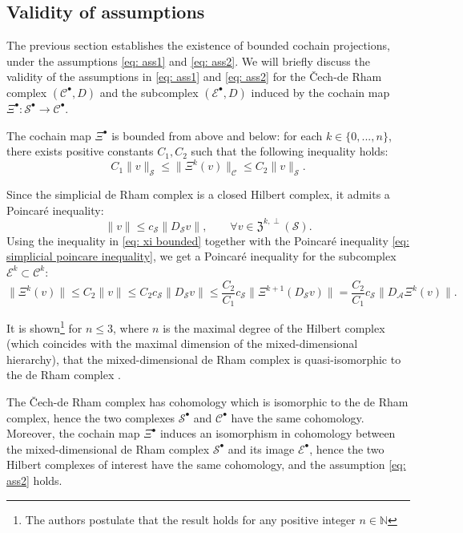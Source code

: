 \documentclass[reqno]{amsart}
\numberwithin{equation}{section}
\theoremstyle{definition}
\newcommand{\Ac}{\mathcal{A}}
\newcommand{\Cc}{\mathcal{C}}
\newcommand{\Ec}{\mathcal{E}}
\newcommand{\Sc}{\mathcal{S}}
\begin{document}
\subsection{Validity of assumptions} 
The previous section establishes the existence of bounded cochain projections, under the assumptions \cref{eq: ass1} and \cref{eq: ass2}. We will briefly discuss the validity of the assumptions in \cref{eq: ass1} and \cref{eq: ass2} for the \v{C}ech-de Rham complex $(\Cc^\bullet, D)$ and the subcomplex $(\Ec^\bullet, D)$ induced by the cochain map $\Xi^\bullet: \Sc^\bullet \to \Cc^\bullet$.

The cochain map $\Xi^\bullet$ is bounded from above and below: for each $k \in \{0,..., n\}$, there exists positive constants $C_1,C_2$ such that the following inequality holds:
\begin{equation}\label{eq: xi bounded}
C_1 \|v\|_\Sc \leq \|\Xi^k(v)\|_\Cc \leq C_2 \|v\|_\Sc.
\end{equation}

Since the simplicial de Rham complex is a closed Hilbert complex, it admits a Poincaré inequality:
\begin{equation} \label{eq: simplicial poincare inequality}
\|v\| \leq c_{\Sc} \|D_\Sc v\|, \qquad \forall v \in \mathfrak{Z}^{k,\perp}(\Sc).
\end{equation}
Using the inequality in \cref{eq: xi bounded} together with the Poincaré inequality \cref{eq: simplicial poincare inequality}, we get a Poincaré inequality for the subcomplex $\mathcal{E}^k \subset \Cc^k$:
\begin{equation}
\|\Xi^k(v)\| \leq C_2 \|v\| \leq C_2 c_{\Sc} \|D_\Sc v\| \leq \frac{C_2}{C_1} c_{\Sc} \|\Xi^{k+1}(D_\Sc v)\| = \frac{C_2}{C_1} c_{\Sc}  \|D_\Ac \Xi^k(v)\|. 
\end{equation}

It is shown\footnote{The authors postulate that the result holds for any positive integer $n \in \mathbb{N}$} for $n \leq 3$, where $n$ is the maximal degree of the Hilbert complex (which coincides with the maximal dimension of the mixed-dimensional hierarchy), that the mixed-dimensional de Rham complex is quasi-isomorphic to the de Rham complex \cite[Theorem 3.3]{mdG}.


The \v{C}ech-de Rham complex has cohomology which is isomorphic to the de Rham complex, hence the two complexes $\Sc^\bullet$ and $\Cc^\bullet$ have the same cohomology. Moreover, the cochain map $\Xi^\bullet$ induces an isomorphism in cohomology between the mixed-dimensional de Rham complex $\Sc^\bullet$ and its image $\Ec^\bullet$, hence the two Hilbert complexes of interest have the same cohomology, and the assumption \cref{eq: ass2} holds.
\end{document}
